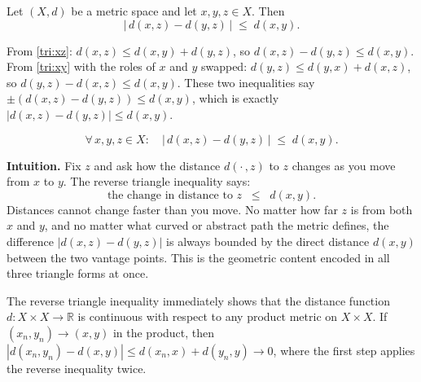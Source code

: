 \bigskip

\bigskip

\begin{proposition}
\label{prop:reverse-triangle}
Let $(X,d)$ be a metric space and let $x,y,z\in X$.
Then
\[
\bigl|\,d(x,z) - d(y,z)\,\bigr| \;\le\; d(x,y).
\]
\end{proposition}

\begin{remark*}
From \eqref{tri:xz}: $d(x,z)\le d(x,y)+d(y,z)$, so
$d(x,z)-d(y,z)\le d(x,y)$.
From \eqref{tri:xy} with the roles of $x$ and $y$ swapped:
$d(y,z)\le d(y,x)+d(x,z)$, so $d(y,z)-d(x,z)\le d(x,y)$.
These two inequalities say $\pm(d(x,z)-d(y,z))\le d(x,y)$, which is
exactly $|d(x,z)-d(y,z)|\le d(x,y)$.
\end{remark*}

\begin{remark*}
\[
\forall\,x,y,z\in X:\quad
\bigl|\,d(x,z)-d(y,z)\,\bigr| \;\le\; d(x,y).
\]
\end{remark*}

\begin{tcolorbox}[colback=propbox, colframe=propborder, arc=2pt,
  left=8pt, right=8pt, top=6pt, bottom=6pt]
\noindent\textbf{Intuition.}\quad
Fix $z$ and ask how the distance $d(\cdot\,,z)$ to $z$ changes as you
move from $x$ to $y$.
The reverse triangle inequality says:
\[
\text{the change in distance to }z \;\;\le\;\; d(x,y).
\]
Distances cannot change faster than you move.
No matter how far $z$ is from both $x$ and $y$, and no matter what
curved or abstract path the metric defines, the difference
$|d(x,z)-d(y,z)|$ is always bounded by the direct distance $d(x,y)$
between the two vantage points.
This is the geometric content encoded in all three triangle forms at once.
\end{tcolorbox}

\begin{remark*}
The reverse triangle inequality immediately shows that the distance
function $d : X \times X \to \mathbb{R}$ is continuous with respect to
any product metric on $X \times X$.
If $(x_n, y_n) \to (x, y)$ in the product, then
$|d(x_n, y_n) - d(x,y)| \le d(x_n,x) + d(y_n,y) \to 0$,
where the first step applies the reverse inequality twice.
\end{remark*}

